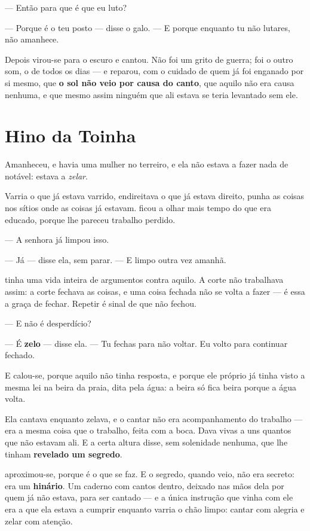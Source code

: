 \documentclass[livro.tex]{subfiles}
\begin{document}
\medskip
\noindent --- Então para que é que eu luto?

--- Porque é o teu posto --- disse o galo. --- E porque enquanto tu não
lutares, não amanhece.

\medskip
\noindent Depois virou-se para o escuro e cantou. Não foi um grito de guerra;
foi o outro som, o de todos os dias --- e \Ben reparou, com o cuidado de quem
já foi enganado por si mesmo, que \textbf{o sol não veio por causa do canto},
que aquilo não era causa nenhuma, e que mesmo assim ninguém que ali estava se
teria levantado sem ele.

\chapter{Hino da Toinha}

Amanheceu, e havia uma mulher no terreiro, e ela não estava a fazer nada de
notável: estava a \emph{zelar}.

Varria o que já estava varrido, endireitava o que já estava direito, punha as
coisas nos sítios onde as coisas já estavam. \Ben ficou a olhar mais tempo do
que era educado, porque lhe pareceu trabalho perdido.

\medskip
\noindent --- A senhora já limpou isso.

--- Já --- disse ela, sem parar. --- E limpo outra vez amanhã.

\medskip
\noindent \Ben tinha uma vida inteira de argumentos contra aquilo. A corte
não trabalhava assim: a corte fechava as coisas, e uma coisa fechada não se
volta a fazer --- é essa a graça de fechar. Repetir é sinal de que não fechou.

\medskip
\noindent --- E não é desperdício?

--- É \textbf{zelo} --- disse ela. --- Tu fechas para não voltar. Eu volto para
continuar fechado.

\medskip
\noindent E \Ben calou-se, porque aquilo não tinha resposta, e porque ele
próprio já tinha visto a mesma lei na beira da praia, dita pela água: a beira só
fica beira porque a água volta.

\medskip
\noindent Ela cantava enquanto zelava, e o cantar não era acompanhamento do
trabalho --- era a mesma coisa que o trabalho, feita com a boca. Dava vivas a
uns quantos que não estavam ali. E a certa altura disse, sem solenidade nenhuma,
que lhe tinham \textbf{revelado um segredo}.

\medskip
\noindent \Ben aproximou-se, porque é o que se faz. E o segredo, quando veio,
não era secreto: era um \textbf{hinário}. Um caderno com cantos dentro, deixado
nas mãos dela por quem já não estava, para ser cantado --- e a única instrução
que vinha com ele era a que ela estava a cumprir enquanto varria o chão limpo:
cantar com alegria e zelar com atenção.
\end{document}
